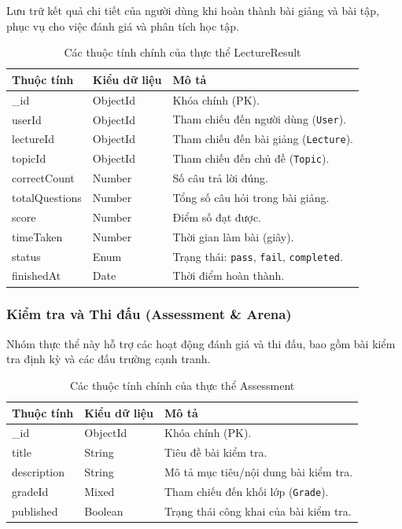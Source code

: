 Lưu trữ kết quả chi tiết của người dùng khi hoàn thành bài giảng và bài tập, phục vụ cho việc đánh giá và phân tích học tập.

\begin{table}[H]
	\centering
	\begin{tabularx}{\textwidth}{|l|l|X|}
		\hline
		\textbf{Thuộc tính} & \textbf{Kiểu dữ liệu} & \textbf{Mô tả} \\ \hline
		\_id & ObjectId & Khóa chính (PK). \\ \hline
		userId & ObjectId & Tham chiếu đến người dùng (\texttt{User}). \\ \hline
		lectureId & ObjectId & Tham chiếu đến bài giảng (\texttt{Lecture}). \\ \hline
		topicId & ObjectId & Tham chiếu đến chủ đề (\texttt{Topic}). \\ \hline
		correctCount & Number & Số câu trả lời đúng. \\ \hline
		totalQuestions & Number & Tổng số câu hỏi trong bài giảng. \\ \hline
		score & Number & Điểm số đạt được. \\ \hline
		timeTaken & Number & Thời gian làm bài (giây). \\ \hline
		status & Enum & Trạng thái: \texttt{pass}, \texttt{fail}, \texttt{completed}. \\ \hline
		finishedAt & Date & Thời điểm hoàn thành. \\ \hline
	\end{tabularx}
	\caption{Các thuộc tính chính của thực thể LectureResult}
\end{table}

\subsubsection{Kiểm tra và Thi đấu (Assessment \& Arena)}
Nhóm thực thể này hỗ trợ các hoạt động đánh giá và thi đấu, bao gồm bài kiểm tra định kỳ và các đấu trường cạnh tranh.

\begin{table}[H]
	\centering
	\begin{tabularx}{\textwidth}{|l|l|X|}
		\hline
		\textbf{Thuộc tính} & \textbf{Kiểu dữ liệu} & \textbf{Mô tả} \\ \hline
		\_id & ObjectId & Khóa chính (PK). \\ \hline
		title & String & Tiêu đề bài kiểm tra. \\ \hline
		description & String & Mô tả mục tiêu/nội dung bài kiểm tra. \\ \hline
		gradeId & Mixed & Tham chiếu đến khối lớp (\texttt{Grade}). \\ \hline
		published & Boolean & Trạng thái công khai của bài kiểm tra. \\ \hline
	\end{tabularx}
	\caption{Các thuộc tính chính của thực thể Assessment}
\end{table}

